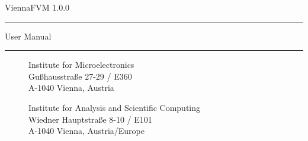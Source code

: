 
\begin{titlepage}

\vspace*{3cm}
\Huge{ViennaFVM 1.0.0}
\rule[0.0cm]{8.9cm}{0.05cm}
\begin{flushright}
\Large{User Manual}
\end{flushright}

\vspace{11.2cm}
\rule[0.0cm]{16.0cm}{0.05cm}
\begin{figure}[!ht]
   \vspace{-1.0cm}
   \begin{minipage}{2cm}
   \end{minipage}
   \hfill
   \begin{minipage}{9.5cm}
      \begin{flushright}
      \vspace{0.2cm}
      Institute for Microelectronics\\
      Gu\ss hausstra\ss e 27-29 / E360\\
      A-1040 Vienna, Austria\\
      \end{flushright}
      \vspace{0.1cm}
      \begin{flushright}
      Institute for Analysis and Scientific Computing\\
      Wiedner Hauptstra\ss e 8-10 / E101\\
      A-1040 Vienna, Austria/Europe\\
      \end{flushright}
   \end{minipage}
   \hfill
   \begin{minipage}{2.6cm}
       \\
      \hspace*{0.3cm}
   \end{minipage}
\end{figure}

\end{titlepage}


